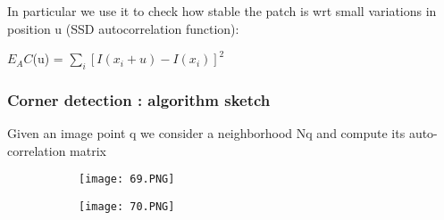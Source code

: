 \documentclass{article}
\begin{document}
In particular we use it to check how stable the patch is wrt small variations in position u (SSD autocorrelation function):

$E_AC$(u) = $\displaystyle\sum_{i} [I(x_i + u) - I(x_i)]^2$

\subsubsection{Corner detection : algorithm sketch}

Given an image point q we consider a neighborhood Nq and compute its auto-correlation matrix


\begin{figure}[ht!]
  \centering
  \begin{subfigure}[b]{0.5\linewidth}
    \texttt{[image: 69.PNG]}
  \end{subfigure}
     \begin{subfigure}[b]{0.49\textwidth}
         \centering
         \texttt{[image: 70.PNG]}
     \end{subfigure}
\end{figure}
\end{document}
